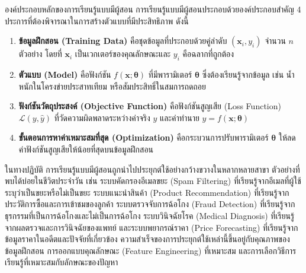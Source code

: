 \begin{myBox}[]{องค์ประกอบหลักของการเรียนรู้แบบมีผู้สอน}{}
การเรียนรู้แบบมีผู้สอนประกอบด้วยองค์ประกอบสำคัญ 4 ประการที่ต้องพิจารณาในการสร้างตัวแบบที่มีประสิทธิภาพ ดังนี้

\begin{enumerate}
\item \textbf{ข้อมูลฝึกสอน (Training Data)} คือชุดข้อมูลที่ประกอบด้วยคู่ลำดับ $(\mathbf{x}_i, y_i)$ จำนวน $n$ ตัวอย่าง โดยที่ $\mathbf{x}_i$ เป็นเวกเตอร์ของคุณลักษณะและ $y_i$ คือฉลากที่ถูกต้อง

\item \textbf{ตัวแบบ (Model)} คือฟังก์ชัน $f(\mathbf{x}; \boldsymbol{\theta})$ ที่มีพารามิเตอร์ $\boldsymbol{\theta}$ ซึ่งต้องเรียนรู้จากข้อมูล เช่น น้ำหนักในโครงข่ายประสาทเทียม หรือสัมประสิทธิ์ในสมการถดถอย

\item \textbf{ฟังก์ชันวัตถุประสงค์ (Objective Function)} คือฟังก์ชันสูญเสีย (Loss Function) $\mathcal{L}(y, \hat{y})$ ที่วัดความผิดพลาดระหว่างค่าจริง $y$ และค่าทำนาย $\hat{y} = f(\mathbf{x}; \boldsymbol{\theta})$

\item \textbf{ขั้นตอนการหาค่าเหมาะสมที่สุด (Optimization)} คือกระบวนการปรับพารามิเตอร์ $\boldsymbol{\theta}$ ให้ลดค่าฟังก์ชันสูญเสียให้น้อยที่สุดบนข้อมูลฝึกสอน
\end{enumerate}
\end{myBox}

ในทางปฏิบัติ การเรียนรู้แบบมีผู้สอนถูกนำไปประยุกต์ใช้อย่างกว้างขวางในหลากหลายสาขา ตัวอย่างที่พบได้บ่อยในชีวิตประจำวัน เช่น ระบบคัดกรองอีเมลขยะ (Spam Filtering) ที่เรียนรู้จากอีเมลที่ผู้ใช้ระบุว่าเป็นขยะหรือไม่เป็นขยะ ระบบแนะนำสินค้า (Product Recommendation) ที่เรียนรู้จากประวัติการซื้อและการเข้าชมของลูกค้า ระบบตรวจจับการฉ้อโกง (Fraud Detection) ที่เรียนรู้จากธุรกรรมที่เป็นการฉ้อโกงและไม่เป็นการฉ้อโกง ระบบวินิจฉัยโรค (Medical Diagnosis) ที่เรียนรู้จากผลตรวจและการวินิจฉัยของแพทย์ และระบบพยากรณ์ราคา (Price Forecasting) ที่เรียนรู้จากข้อมูลราคาในอดีตและปัจจัยที่เกี่ยวข้อง ความสำเร็จของการประยุกต์ใช้เหล่านี้ขึ้นอยู่กับคุณภาพของข้อมูลฝึกสอน การออกแบบคุณลักษณะ (Feature Engineering) ที่เหมาะสม และการเลือกวิธีการเรียนรู้ที่เหมาะสมกับลักษณะของปัญหา

